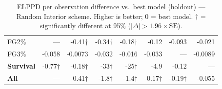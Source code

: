 \documentclass{article}
\begin{document}
\begin{table}[H]
{\begin{tabular}{lrrrrrrr}
FG2\% & --- & -0.41$\dagger$ & -0.34$\dagger$ & -0.18$\dagger$ & -0.12 & -0.093 & -0.021 \\[2pt]
FG3\% & -0.058 & -0.0073 & -0.032 & -0.016 & -0.033 & --- & -0.0089 \\[2pt]
\midrule
\textbf{Survival} & -0.77$\dagger$ & -0.18$\dagger$ & -33$\dagger$ & -25$\dagger$ & -4.9 & -0.12 & --- \\
\midrule
\textbf{All} & --- & -0.41$\dagger$ & -1.8$\dagger$ & -1.4$\dagger$ & -0.17$\dagger$ & -0.19$\dagger$ & -0.055 \\
\bottomrule
\end{tabular}
}
\caption{ELPPD per observation difference vs.\ best model (holdout) --- Random Interior scheme. Higher is better; 0 = best model. $\dagger$ = significantly different at 95\% ($|\Delta|>1.96\times\mathrm{SE}$).}
\label{tab:elppd_random_interior}
\end{table}
\end{document}
